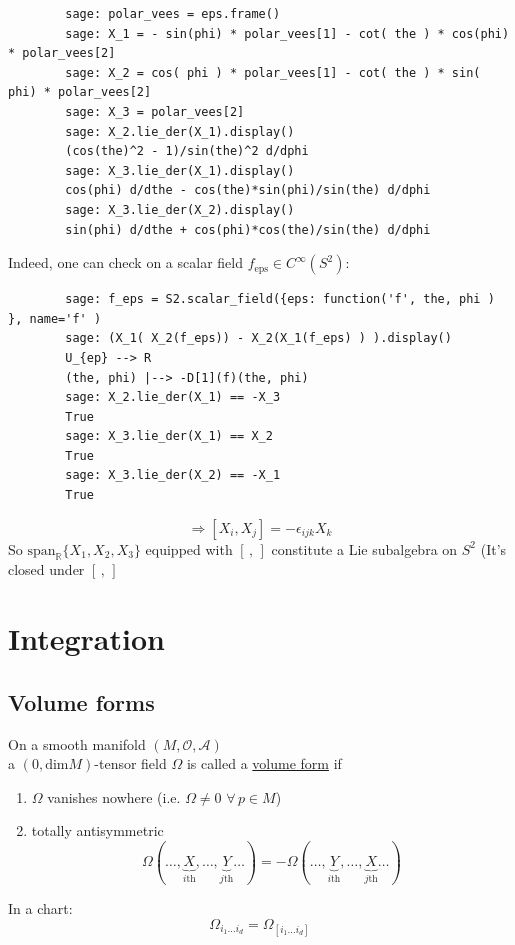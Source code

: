 	\questionhead{}
	
	{\small
		\begin{verbatim}
		sage: polar_vees = eps.frame()
		sage: X_1 = - sin(phi) * polar_vees[1] - cot( the ) * cos(phi) * polar_vees[2]
		sage: X_2 = cos( phi ) * polar_vees[1] - cot( the ) * sin( phi) * polar_vees[2]
		sage: X_3 = polar_vees[2]
		sage: X_2.lie_der(X_1).display()
		(cos(the)^2 - 1)/sin(the)^2 d/dphi
		sage: X_3.lie_der(X_1).display()
		cos(phi) d/dthe - cos(the)*sin(phi)/sin(the) d/dphi
		sage: X_3.lie_der(X_2).display()
		sin(phi) d/dthe + cos(phi)*cos(the)/sin(the) d/dphi
		\end{verbatim}
	}
	
	Indeed, one can check on a scalar field $f_{\text{eps}} \in C^{\infty}(S^2)$:
	{\small
		\begin{verbatim}
		sage: f_eps = S2.scalar_field({eps: function('f', the, phi ) }, name='f' )
		sage: (X_1( X_2(f_eps)) - X_2(X_1(f_eps) ) ).display()
		U_{ep} --> R
		(the, phi) |--> -D[1](f)(the, phi)
		sage: X_2.lie_der(X_1) == -X_3
		True
		sage: X_3.lie_der(X_1) == X_2
		True
		sage: X_3.lie_der(X_2) == -X_1
		True
		\end{verbatim}
	}
	
	\[
	\Longrightarrow \boxed{ [X_i, X_j] = -\epsilon_{ijk}X_k }
	\]
	So $\text{span}_{\mathbb{R}} \lbrace X_1,X_2,X_3 \rbrace$ equipped with $[ \, , \, ]$ constitute a Lie subalgebra on $S^2$ (It's closed under $[ \, , \, ]$
	
	\section{Integration}
	
	\subsection{}
	
	\subsection{}
	
	\subsection{Volume forms}
	
	\begin{definition}
		On a smooth manifold $(M,\mathcal{O},\mathcal{A})$ \\
		a $(0,\text{dim}M)$-tensor field $\Omega$ is called a \underline{volume form} if 
		\begin{enumerate}
			\item[(a)] $\Omega$ vanishes nowhere (i.e. $\Omega \neq 0 \, \, \forall \, p \in M$) 
			\item[(b)] totally antisymmetric 
			\[
			\Omega(\dots , \underbrace{X}_{i\text{th}} , \dots , \underbrace{Y}_{j\text{th}} \dots ) = - \Omega(\dots , \underbrace{Y}_{i\text{th}} , \dots , \underbrace{X}_{j\text{th}} \dots )
			\]
		\end{enumerate}
		
		In a chart: 
		\[
		\Omega_{i_1 \dots i_d} = \Omega_{ [i_1 \dots i_d ]}
		\]
	\end{definition}
	
